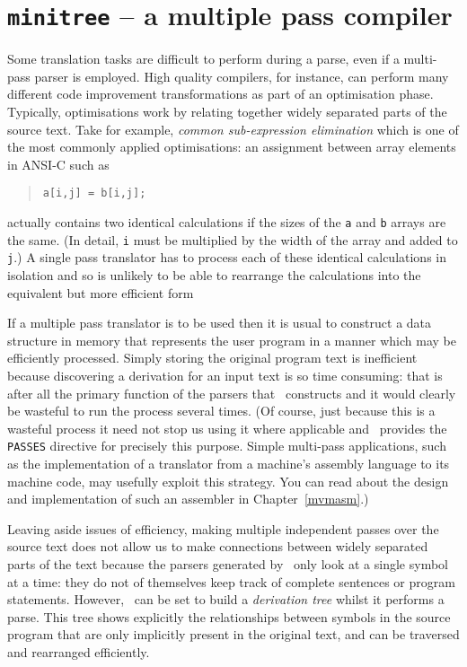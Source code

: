 \chapter{{\tt minitree} -- a multiple pass compiler}
\label{minitree}

Some translation tasks are difficult to perform during a parse, even if
a multi-pass parser is employed. High quality compilers, for instance,
can perform many different code improvement transformations as part of
an optimisation phase. Typically, optimisations work by relating
together widely separated parts of the source text. Take for example,
{\em common sub-expression elimination} which is one of the most
commonly applied optimisations: an assignment between array elements in
ANSI-C such as \begin{quote} \verb+a[i,j] = b[i,j];+ \end{quote}
actually contains two identical calculations if the sizes of the {\tt a}
and {\tt b} arrays are the same. (In detail, {\tt i} must be multiplied
by the width of the array and added to {\tt j}.) A single pass
translator has to process each of these identical calculations in
isolation and so is unlikely to be able to rearrange the calculations
into the equivalent but more efficient form 

If a multiple pass translator is to be used then it is usual to
construct a data structure  in memory that represents the user program
in a manner which may be efficiently processed.  Simply storing the
original program text is inefficient because discovering a derivation
for an input text is so time consuming: that is after all the primary
function of the parsers that \rdp\ constructs and it would clearly be
wasteful to run the process several times. (Of course, just  because this
is a wasteful process it need not stop us using it where applicable and
\rdp\ provides the {\tt PASSES} directive for precisely this purpose.
Simple multi-pass applications, such as the implementation of a
translator from a machine's assembly language to its machine code, may
usefully exploit this strategy. You can read about the design and
implementation of such an assembler in Chapter~\ref{mvmasm}.)

Leaving aside issues of efficiency, making multiple independent passes
over the source text does not allow us to make connections
between widely separated parts of the text because the parsers generated
by \rdp\ only look at a single symbol at a time: they do not of
themselves keep track of complete sentences or program statements.
However, \rdp\ can be set to build a {\em derivation tree} whilst it
performs a parse. This tree shows explicitly the relationships between symbols in the
source program that are only implicitly present in the original text, and
can be traversed and rearranged efficiently.

